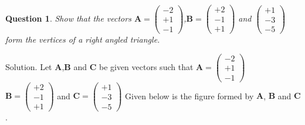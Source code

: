 \documentclass{article}
\newtheorem{question}[theorem]{Question}
\newcommand{\vect}[1]{\boldsymbol{\mathbf{#1}}}
\newcommand{\myvec}[1]{\ensuremath{\begin{pmatrix}#1\end{pmatrix}}}
\begin{document}
\begin{question}
	Show that the vectors $\vect{A}=\myvec{-2 \\ +1 \\ -1}$,$\vect{B}=\myvec{+2 \\ -1 \\ +1}$ and $\myvec{+1\\-3\\-5}$
form the vertices of a right angled triangle.
\end{question}
Solution. Let $\vect{A}$,$\vect{B}$  and $\vect{C}$ be given vectors such that $\vect{A} = \myvec{-2 \\ +1 \\ -1}$ \\
$\vect{B}=\myvec{+2 \\ -1 \\ +1}$ and $\vect{C}= \myvec{+1\\-3\\-5}$
Given below is the figure formed by $\vect{A}$, $\vect{B}$ and $\vect{C}$.
\end{document}
